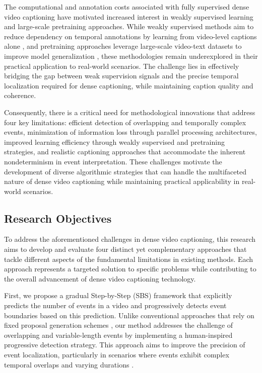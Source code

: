 The computational and annotation costs associated with fully supervised dense video captioning have motivated increased interest in weakly supervised learning and large-scale pretraining approaches. While weakly supervised methods aim to reduce dependency on temporal annotations by learning from video-level captions alone \cite{Duan2018-qf, Shen2017-gx}, and pretraining approaches leverage large-scale video-text datasets to improve model generalization \cite{Yang2023-fm, Huang2020-as}, these methodologies remain underexplored in their practical application to real-world scenarios. The challenge lies in effectively bridging the gap between weak supervision signals and the precise temporal localization required for dense captioning, while maintaining caption quality and coherence.

Consequently, there is a critical need for methodological innovations that address four key limitations: efficient detection of overlapping and temporally complex events, minimization of information loss through parallel processing architectures, improved learning efficiency through weakly supervised and pretraining strategies, and realistic captioning approaches that accommodate the inherent nondeterminism in event interpretation. These challenges motivate the development of diverse algorithmic strategies that can handle the multifaceted nature of dense video captioning while maintaining practical applicability in real-world scenarios.



\subsection{Research Objectives}

To address the aforementioned challenges in dense video captioning, this research aims to develop and evaluate four distinct yet complementary approaches that tackle different aspects of the fundamental limitations in existing methods. Each approach represents a targeted solution to specific problems while contributing to the overall advancement of dense video captioning technology.

First, we propose a gradual Step-by-Step (SBS) framework that explicitly predicts the number of events in a video and progressively detects event boundaries based on this prediction. Unlike conventional approaches that rely on fixed proposal generation schemes \cite{Krishna2017-pw, Wang2018-ap}, our method addresses the challenge of overlapping and variable-length events by implementing a human-inspired progressive detection strategy. This approach aims to improve the precision of event localization, particularly in scenarios where events exhibit complex temporal overlaps and varying durations \cite{Choi2023-so}.

